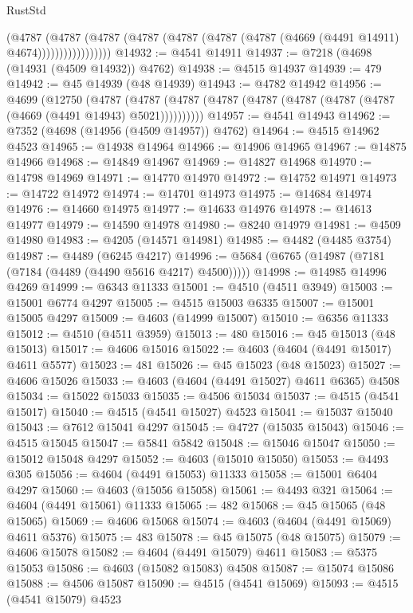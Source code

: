 \begin{lexlean}{RustStd}
\begin{coremodule}
                      (@4787
                        (@4787
                          (@4787
                            (@4787 (@4787 (@4787 (@4787 (@4669 (@4491 @14911) @4674)))))))))))))))))
@14932 := @4541 @14911
@14937 := @7218 (@4698 (@14931 (@4509 @14932)) @4762)
@14938 := @4515 @14937
@14939 := 479
@14942 := @45 @14939 (@48 @14939)
@14943 := @4782 @14942
@14956 := @4699
    (@12750
      (@4787 (@4787 (@4787 (@4787 (@4787 (@4787 (@4787 (@4787 (@4669 (@4491 @14943) @5021))))))))))
@14957 := @4541 @14943
@14962 := @7352 (@4698 (@14956 (@4509 @14957)) @4762)
@14964 := @4515 @14962 @4523
@14965 := @14938 @14964
@14966 := @14906 @14965
@14967 := @14875 @14966
@14968 := @14849 @14967
@14969 := @14827 @14968
@14970 := @14798 @14969
@14971 := @14770 @14970
@14972 := @14752 @14971
@14973 := @14722 @14972
@14974 := @14701 @14973
@14975 := @14684 @14974
@14976 := @14660 @14975
@14977 := @14633 @14976
@14978 := @14613 @14977
@14979 := @14590 @14978
@14980 := @8240 @14979
@14981 := @4509 @14980
@14983 := @4205 (@14571 @14981)
@14985 := @4482 (@4485 @3754)
@14987 := @4489 (@6245 @4217)
@14996 := @5684 (@6765 (@14987 (@7181 (@7184 (@4489 (@4490 @5616 @4217) @4500)))))
@14998 := @14985 @14996 @4269
@14999 := @6343 @11333
@15001 := @4510 (@4511 @3949)
@15003 := @15001 @6774 @4297
@15005 := @4515 @15003 @6335
@15007 := @15001 @15005 @4297
@15009 := @4603 (@14999 @15007)
@15010 := @6356 @11333
@15012 := @4510 (@4511 @3959)
@15013 := 480
@15016 := @45 @15013 (@48 @15013)
@15017 := @4606 @15016
@15022 := @4603 (@4604 (@4491 @15017) @4611 @5577)
@15023 := 481
@15026 := @45 @15023 (@48 @15023)
@15027 := @4606 @15026
@15033 := @4603 (@4604 (@4491 @15027) @4611 @6365) @4508
@15034 := @15022 @15033
@15035 := @4506 @15034
@15037 := @4515 (@4541 @15017)
@15040 := @4515 (@4541 @15027) @4523
@15041 := @15037 @15040
@15043 := @7612 @15041 @4297
@15045 := @4727 (@15035 @15043)
@15046 := @4515 @15045
@15047 := @5841 @5842
@15048 := @15046 @15047
@15050 := @15012 @15048 @4297
@15052 := @4603 (@15010 @15050)
@15053 := @4493 @305
@15056 := @4604 (@4491 @15053) @11333
@15058 := @15001 @6404 @4297
@15060 := @4603 (@15056 @15058)
@15061 := @4493 @321
@15064 := @4604 (@4491 @15061) @11333
@15065 := 482
@15068 := @45 @15065 (@48 @15065)
@15069 := @4606 @15068
@15074 := @4603 (@4604 (@4491 @15069) @4611 @5376)
@15075 := 483
@15078 := @45 @15075 (@48 @15075)
@15079 := @4606 @15078
@15082 := @4604 (@4491 @15079) @4611
@15083 := @5375 @15053
@15086 := @4603 (@15082 @15083) @4508
@15087 := @15074 @15086
@15088 := @4506 @15087
@15090 := @4515 (@4541 @15069)
@15093 := @4515 (@4541 @15079) @4523

\end{coremodule}
\end{lexlean}

